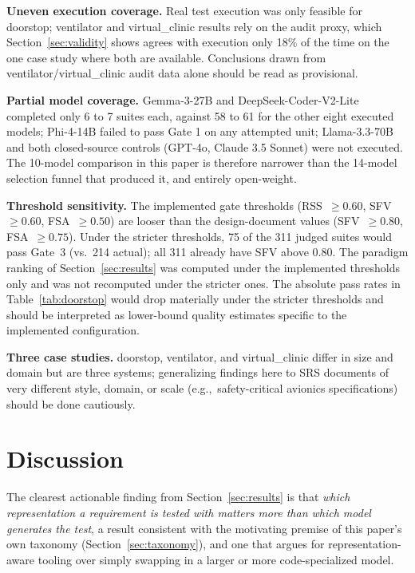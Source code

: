 \documentclass[conference]{IEEEtran}
\newcommand{\eg}{e.g.,\ }
\begin{document}
  \textbf{Uneven execution coverage.} Real test execution was only feasible for
  doorstop; ventilator and virtual\_clinic results rely on the audit proxy,
  which Section~\ref{sec:validity} shows agrees with execution only 18\% of the
  time on the one case study where both are available. Conclusions drawn from
  ventilator/virtual\_clinic audit data alone should be read as provisional.

  \textbf{Partial model coverage.} Gemma-3-27B and DeepSeek-Coder-V2-Lite
  completed only 6 to 7 suites each, against 58 to 61 for the other eight executed
  models; Phi-4-14B failed to pass Gate 1 on any attempted unit; Llama-3.3-70B
  and both closed-source controls (GPT-4o, Claude 3.5 Sonnet) were not
  executed. The 10-model comparison in this paper is therefore narrower than
  the 14-model selection funnel that produced it, and entirely open-weight.

  \textbf{Threshold sensitivity.} The implemented gate thresholds (RSS~$\geq 0.60$,
  SFV~$\geq 0.60$, FSA~$\geq 0.50$) are looser than the design-document
  values (SFV~$\geq 0.80$, FSA~$\geq 0.75$). Under the stricter thresholds,
  75 of the 311 judged suites would pass Gate~3 (vs.\ 214 actual);
  all 311 already have SFV above 0.80. The paradigm ranking of
  Section~\ref{sec:results} was computed under the implemented thresholds only
  and was not recomputed under the stricter ones. The absolute pass rates in Table~\ref{tab:doorstop} would
  drop materially under the stricter thresholds and should be interpreted as
  lower-bound quality estimates specific to the implemented configuration.

  \textbf{Three case studies.} doorstop, ventilator, and virtual\_clinic differ
  in size and domain but are three systems; generalizing findings here to SRS
  documents of very different style, domain, or scale (\eg safety-critical
  avionics specifications) should be done cautiously.

  \section{Discussion}

  The clearest actionable finding from Section~\ref{sec:results} is that
  \emph{which representation a requirement is tested with matters more than
  which model generates the test}, a result consistent with the motivating
  premise of this paper's own taxonomy (Section~\ref{sec:taxonomy}), and one
  that argues for representation-aware tooling over simply swapping in a larger
  or more code-specialized model.
\end{document}
